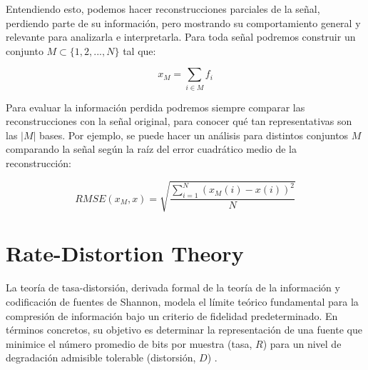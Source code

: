     Entendiendo esto, podemos hacer reconstrucciones parciales de la señal, perdiendo parte de su información, pero mostrando su comportamiento general y relevante para analizarla e interpretarla. Para toda señal podremos construir un conjunto $M \subset \{1,2,...,N\}$ tal que:

    \begin{equation*}
        x_M = \sum_{i \in M} f_i
    \end{equation*}

    \vspace{0.4cm}

    Para evaluar la información perdida podremos siempre comparar las reconstrucciones con la señal original, para conocer qué tan representativas son las $|M|$ bases. Por ejemplo, se puede hacer un análisis para distintos conjuntos $M$ comparando la señal según la raíz del error cuadrático medio de la reconstrucción:

    \begin{equation*}
        RMSE(x_M, x) = \sqrt{\frac{\sum_{i=1}^N{\left(x_M(i) - x(i)\right)^2}}{N}}
    \end{equation*}



\section{Rate-Distortion Theory}\label{sec: rdt}
    La teoría de tasa-distorsión, derivada formal de la teoría de la información y codificación de fuentes de Shannon, modela el límite teórico fundamental para la compresión de información bajo un criterio de fidelidad predeterminado. En términos concretos, su objetivo es determinar la representación de una fuente que minimice el número promedio de bits por muestra (tasa, $R$) para un nivel de degradación admisible tolerable (distorsión, $D$) \cite{ortega1998rate}. \\

